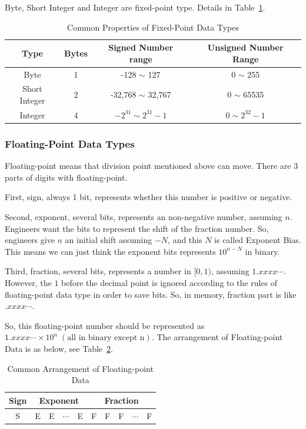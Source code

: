 \documentclass{article}
\begin{document}
Byte, Short Integer and Integer are fixed-point type. Details in Table~\ref{tab:fixed-point}.

\begin{table}[!ht]
    \centering
    \begin{tabular}{|c|c|c|c|}
    \hline
        Type & Bytes & Signed Number range & Unsigned Number Range \\ \hline
        Byte & 1 & -128 $\sim$ 127 & 0 $\sim$ 255 \\ \hline
        Short Integer & 2 & -32,768 $\sim$ 32,767 & 0 $\sim$ 65535 \\ \hline
        Integer & 4 & $- 2^{31} \sim 2^{31} - 1$ & $0 \sim 2^{32} - 1$ \\ \hline
    \end{tabular}
    \caption{Common Properties of Fixed-Point Data Types}
    \label{tab:fixed-point}
\end{table}

\subsubsection{Floating-Point Data Types}
Floating-point means that division point mentioned above can move. There are 3 parts of digits with floating-point. 

First, sign, always 1 bit, represents whether this number is positive or negative. 

Second, exponent, several bits, represents an non-negative number, assuming $n$. Engineers want the bits to represent the shift of the fraction number. So, engineers give $n$ an initial shift assuming $-N$, and this $N$ is called Exponent Bias. This means we can just think the exponent bits represents $10^{n - N}$ in binary.

Third, fraction, several bits, represents a number in $[0, 1)$, assuming $1.xxxx\cdots$. However, the $1$ before the decimal point is ignored according to the rules of floating-point data type in order to save bits. So, in memory, fraction part is like $.xxxx\cdots$.

So, this floating-point number should be represented as $1.xxxx\cdots \times 10^n \; (\text{all in binary except n})$. 
The arrangement of Floating-point Data is as below, see Table~\ref{tab:floating-point-arrangement}.

\begin{table}[!ht]
    \centering
    \begin{tabular}{|c|c|c|c|c|c|c|c|c|c|}
    \hline
        Sign & \multicolumn{4}{|c}{Exponent}  & \multicolumn{5}{|c|}{Fraction} \\ \hline
        S & E & E & $\cdots$ & E & F & F & F & $\cdots$ & F \\ \hline
    \end{tabular}
    \caption{Common Arrangement of Floating-point Data}
    \label{tab:floating-point-arrangement}
\end{table}
\end{document}

